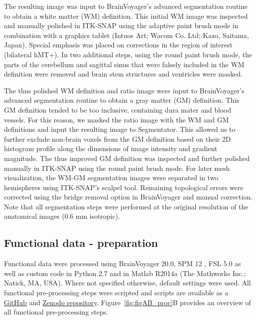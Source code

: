 The resulting image was input to BrainVoyager's advanced segmentation routine to obtain a white matter (WM) definition. This initial WM image was inspected and manually polished in ITK-SNAP using the adaptive paint brush mode in combination with a graphics tablet (Intuos Art; Wacom Co. Ltd; Kazo, Saitama, Japan). Special emphasis was placed on corrections in the region of interest (bilateral hMT+). In two additional steps, using the round paint brush mode, the parts of the cerebellum and sagittal sinus that were falsely included in the WM definition were removed and brain stem structures and ventricles were masked.

The thus polished WM definition and ratio image were input to BrainVoyager's advanced segmentation routine to obtain a gray matter (GM) definition. This GM definition tended to be too inclusive, containing dura mater and blood vessels. For this reason, we masked the ratio image with the WM and GM definitions and input the resulting image to Segmentator. This allowed us to further exclude non-brain voxels from the GM definition based on their 2D histogram profile along the dimensions of image intensity and gradient magnitude. The thus improved GM definition was inspected and further polished manually in ITK-SNAP using the round paint brush mode. For later mesh visualization, the WM-GM segmentation images were separated in two hemispheres using ITK-SNAP's scalpel tool. Remaining topological errors were corrected using the bridge removal option in BrainVoyager \parencite{Kriegeskorte2001} and manual correction. Note that all segmentation steps were performed at the original resolution of the anatomical images (0.6 mm isotropic).

\subsection{Functional data - preparation}
Functional data were processed using BrainVoyager 20.0, SPM 12 \parencite{Friston2006}, FSL 5.0 \parencite{Jenkinson2012} as well as custom code in Python 2.7 \parencite{numpy2011, scipy2001, matplotlib2007} and in Matlab R2014a (The Mathworks Inc.; Natick, MA, USA). Where not specified otherwise, default settings were used. All functional pre-processing steps were scripted and scripts are available as a \href{https://github.com/MSchnei/motion_quartet_scripts}{GitHub} and \href{https://zenodo.org/record/1489246}{Zenodo repository}. Figure~\ref{fig:figAB_proc}B provides an overview of all functional pre-processing steps. 

